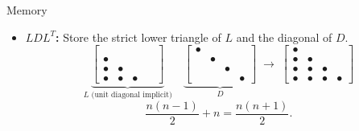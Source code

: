 \documentclass[10pt]{beamer}
\begin{document}
\begin{frame}{Memory}
\begin{itemize}
    \item \textbf{$LDL^T$:} Store the strict lower triangle
    of $L$ and the diagonal of $D$.
    \[
    \underbrace{
    \begin{bmatrix}
    \phantom{\bullet} & \phantom{\bullet} & \phantom{\bullet} & \phantom{\bullet}\\
    \bullet & \phantom{\bullet} & \phantom{\bullet} & \phantom{\bullet}\\
    \bullet & \bullet & \phantom{\bullet} & \phantom{\bullet}\\
    \bullet & \bullet & \bullet & \phantom{\bullet}
    \end{bmatrix}
    }_{L\text{ (unit diagonal implicit)}}
    \quad
    \underbrace{
    \begin{bmatrix}
    \bullet & \phantom{\bullet} & \phantom{\bullet} & \phantom{\bullet}\\
    \phantom{\bullet} & \bullet & \phantom{\bullet} & \phantom{\bullet}\\
    \phantom{\bullet} & \phantom{\bullet} & \bullet & \phantom{\bullet}\\
    \phantom{\bullet} & \phantom{\bullet} & \phantom{\bullet} & \bullet
    \end{bmatrix}
    }_{D}
    \;\longrightarrow\;
    \begin{bmatrix}
    \bullet & \phantom{\bullet} & \phantom{\bullet} & \phantom{\bullet}\\
    \bullet & \bullet & \phantom{\bullet} & \phantom{\bullet}\\
    \bullet & \bullet & \bullet & \phantom{\bullet}\\
    \bullet & \bullet & \bullet & \bullet
    \end{bmatrix}
    \]
    \[
        \frac{n(n-1)}{2}+n
        =\boxed{\frac{n(n+1)}{2}}.
    \]
\end{itemize}

\end{frame}
\end{document}
